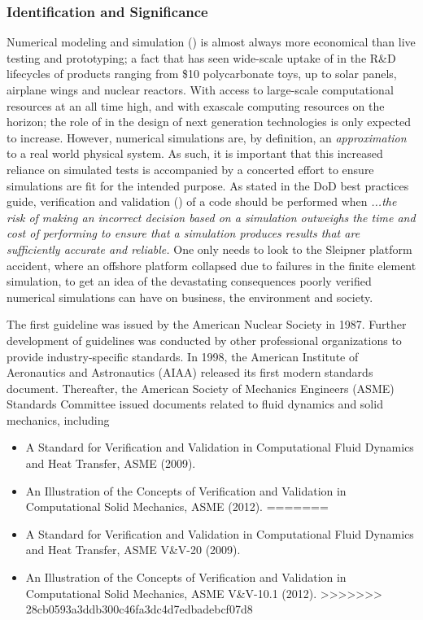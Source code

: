 \subsubsection{Identification and Significance}
\label{intro}
Numerical modeling and simulation (\MS) is almost always more economical than live testing and prototyping; a fact that has seen wide-scale uptake of \MS in the R\&D lifecycles of products ranging from \$10 polycarbonate toys, up to solar panels, airplane wings and nuclear reactors. With access to large-scale computational resources at an all time high, and with exascale computing resources on the horizon; the role of \MS in the design of next generation technologies is only expected to increase. However, numerical simulations are, by definition, an \emph{approximation} to a real world physical system. As such, it is important that this increased reliance on simulated tests is accompanied by a concerted effort to ensure simulations are fit for the intended purpose.  As stated in the DoD best practices guide, verification and validation (\VV) of a code should be performed when  \emph{...the risk of making an incorrect decision based on a simulation outweighs the time and cost of performing \VV to ensure that a simulation produces results that are sufficiently accurate and reliable.} One only needs to look to the Sleipner platform accident, where an offshore platform collapsed due to failures in the finite element simulation, to get an idea of the devastating consequences poorly verified numerical simulations can have on business, the environment and society.

The first \VV guideline was issued by the American Nuclear Society in 1987. Further development of \VV guidelines was conducted by other professional organizations to provide industry-specific standards. In 1998, the American Institute of Aeronautics and Astronautics (AIAA) released its first modern standards document. Thereafter, the American Society of Mechanics Engineers (ASME) \VV Standards Committee issued documents related to fluid dynamics and solid mechanics, including
\begin{itemize}
<<<<<<< HEAD
 \item A Standard for Verification and Validation in Computational Fluid Dynamics and Heat Transfer, ASME  (2009).
 \item An Illustration of the Concepts of Verification and Validation in Computational Solid Mechanics, ASME  (2012). 
=======
 \item A Standard for Verification and Validation in Computational Fluid Dynamics and Heat Transfer, ASME V\&V-20 (2009).
 \item An Illustration of the Concepts of Verification and Validation in Computational Solid Mechanics, ASME V\&V-10.1 (2012). 
>>>>>>> 28cb0593a3ddb300c46fa3dc4d7edbadebcf07d8
\end{itemize}

